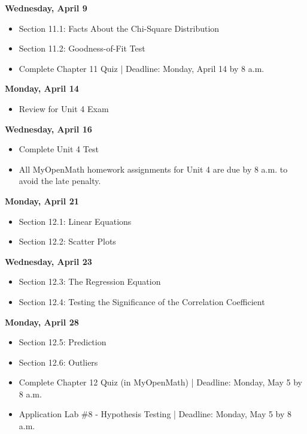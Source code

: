 \documentclass[11pt]{article}
\begin{document}
\textbf{Wednesday, April 9}

\begin{itemize}
\item Section 11.1: Facts About the Chi-Square Distribution
\item Section 11.2: Goodness-of-Fit Test
\item Complete Chapter 11 Quiz | Deadline: Monday, April 14 by 8 a.m.
\end{itemize}

\textbf{Monday, April 14}

\begin{itemize}
\item Review for Unit 4 Exam
\end{itemize}

\textbf{Wednesday, April 16}

\begin{itemize}
\item Complete Unit 4 Test
\item All MyOpenMath homework assignments for Unit 4 are due by 8 a.m. to avoid the late penalty.
\end{itemize}

\textbf{Monday, April 21}

\begin{itemize}
\item Section 12.1: Linear Equations
\item Section 12.2: Scatter Plots
\end{itemize}

\textbf{Wednesday, April 23}

\begin{itemize}
\item Section 12.3: The Regression Equation
\item Section 12.4: Testing the Significance of the Correlation Coefficient
\end{itemize}

\textbf{Monday, April 28}

\begin{itemize}
\item Section 12.5: Prediction
\item Section 12.6: Outliers
\item Complete Chapter 12 Quiz (in MyOpenMath) | Deadline: Monday, May 5 by 8 a.m.
\item Application Lab \#8 - Hypothesis Testing | Deadline: Monday, May 5 by 8 a.m.
\end{itemize}
\end{document}
